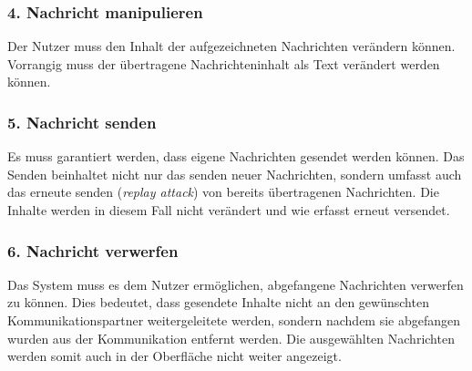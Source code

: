         \subsubsection{4. Nachricht manipulieren}
        Der Nutzer muss den Inhalt der aufgezeichneten Nachrichten verändern können.
        Vorrangig muss der übertragene Nachrichteninhalt als Text verändert werden können.
        
        \subsubsection{5. Nachricht senden}
        Es muss garantiert werden, dass eigene Nachrichten gesendet werden können.
        Das Senden beinhaltet nicht nur das senden neuer Nachrichten, sondern umfasst auch das erneute senden (\emph{replay attack}) von bereits übertragenen Nachrichten. Die Inhalte werden in diesem Fall nicht verändert und wie erfasst erneut versendet.
        
        \subsubsection{6. Nachricht verwerfen}
        Das System muss es dem Nutzer ermöglichen, abgefangene Nachrichten verwerfen zu können.
        Dies bedeutet, dass gesendete Inhalte nicht an den gewünschten Kommunikationspartner weitergeleitete werden, sondern nachdem sie abgefangen wurden aus der Kommunikation entfernt werden.
        Die ausgewählten Nachrichten werden somit auch in der Oberfläche nicht weiter angezeigt.
        
        